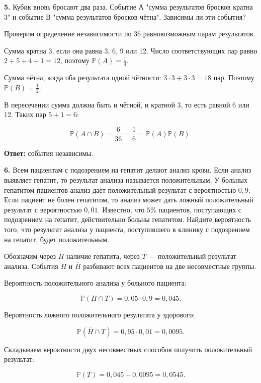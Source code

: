 \begin{task}\label{task-problems-2}
\textbf{5.} Кубик вновь бросают два раза. Событие А "сумма результатов бросков кратна 3" и событие В "сумма результатов бросков чётна". Зависимы ли эти события?
\end{task}

\begin{solution}\label{solution-independent-events-problems-2}
Проверим определение независимости по 36 равновозможным парам результатов.

Сумма кратна 3, если она равна 3, 6, 9 или 12. Число соответствующих пар равно $2+5+4+1=12$, поэтому $\mathbb P(A)=\frac13$.

Сумма чётна, когда оба результата одной чётности: $3\cdot3+3\cdot3=18$ пар. Поэтому $\mathbb P(B)=\frac12$.

В пересечении сумма должна быть и чётной, и кратной 3, то есть равной 6 или 12. Таких пар $5+1=6$:

\[\mathbb P(A\cap B)=\frac6{36}=\frac16=\mathbb P(A)\mathbb P(B).\]

\textbf{Ответ:} события независимы.
\end{solution}

\begin{task}\label{task-problems-3}
\textbf{6.} Всем пациентам с подозрением на гепатит делают анализ крови. Если анализ выявляет гепатит, то результат анализа называется положительным. У больных гепатитом пациентов анализ даёт положительный результат с вероятностью $0,9$. Если пациент не болен гепатитом, то анализ может дать ложный положительный результат с вероятностью $0,01$. Известно, что $5\%$ пациентов, поступающих с подозрением на гепатит, действительно больны гепатитом. Найдите вероятность того, что результат анализа у пациента, поступившего в клинику с подозрением на гепатит, будет положительным.
\end{task}

\begin{solution}\label{solution-independent-events-problems-3}
Обозначим через $H$ наличие гепатита, через $T$ — положительный результат анализа. События $H$ и $\overline H$ разбивают всех пациентов на две несовместные группы.

Вероятность положительного анализа у больного пациента:

\[\mathbb P(H\cap T)=0,05\cdot0,9=0,045.\]

Вероятность ложного положительного результата у здорового:

\[\mathbb P(\overline H\cap T)=0,95\cdot0,01=0,0095.\]

Складываем вероятности двух несовместных способов получить положительный результат:

\[\mathbb P(T)=0,045+0,0095=0,0545.\]
\end{solution}

